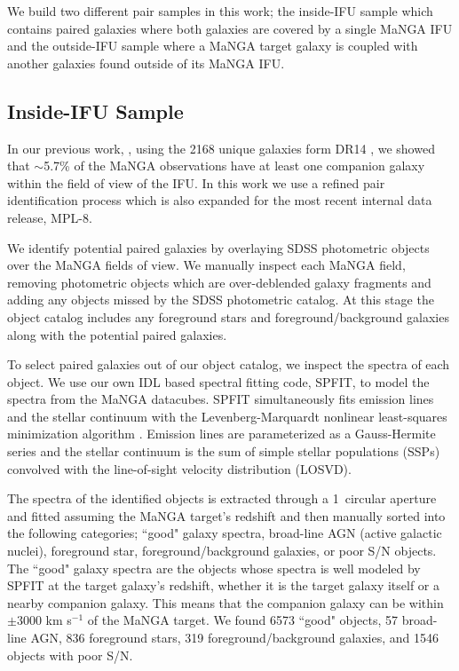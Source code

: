 \documentclass[iop,revtex4,twocolumn,apj,numberedappendix,appendixfloats]{emulateapj}
\begin{document}
We build two different pair samples in this work; the inside-IFU sample which contains paired galaxies where both galaxies are covered by a single MaNGA IFU and the outside-IFU sample where a MaNGA target galaxy is coupled with another galaxies found outside of its MaNGA IFU. 

\subsection{Inside-IFU Sample}\label{sec:inside}

In our previous work, \citet{Fu:2018}, using the 2168 unique galaxies form DR14 \citep{Abolfathi:2018}, we showed that $\sim$5.7\% of the MaNGA observations have at least one companion galaxy within the field of view of the IFU. In this work we use a refined pair identification process which is also expanded for the most recent internal data release, MPL-8.

We identify potential paired galaxies by overlaying SDSS photometric objects over the MaNGA fields of view. We manually inspect each MaNGA field, removing photometric objects which are over-deblended galaxy fragments and adding any objects missed by the SDSS photometric catalog. At this stage the object catalog includes any foreground stars and foreground/background galaxies along with the potential paired galaxies. 

To select paired galaxies out of our object catalog, we inspect the spectra of each object. We use our own {\sc IDL} based spectral fitting code, {\sc SPFIT}, to model the spectra from the MaNGA datacubes. {\sc SPFIT} simultaneously fits emission lines and the stellar continuum with the Levenberg-Marquardt nonlinear least-squares minimization algorithm \citep{Fu:2018}. Emission lines are parameterized as a Gauss-Hermite series and the stellar continuum is the sum of simple stellar populations (SSPs) convolved with the line-of-sight velocity distribution (LOSVD).

The spectra of the identified objects is extracted through a 1\arcsec\ circular aperture and fitted assuming the MaNGA target's redshift and then manually sorted into the following categories; ``good" galaxy spectra, broad-line AGN (active galactic nuclei), foreground star, foreground/background galaxies, or poor S/N objects. The ``good" galaxy spectra are the objects whose spectra is well modeled by {\sc SPFIT} at the target galaxy's redshift, whether it is the target galaxy itself or a nearby companion galaxy. This means that the companion galaxy can be within $\pm$3000 km s$^{-1}$ of the MaNGA target. We found 6573 ``good" objects, 57 broad-line AGN, 836 foreground stars, 319 foreground/background galaxies, and 1546 objects with poor S/N. 
\end{document}
